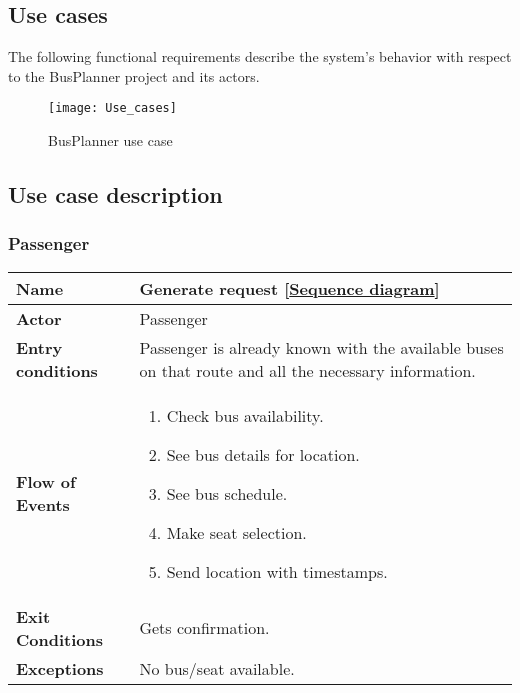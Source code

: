 \subsection{Use cases}
The following functional requirements describe the system’s behavior with respect to the BusPlanner project and its actors.
\begin{figure}[H]
	\centering
	\texttt{[image: Use\_cases]}
	\caption{BusPlanner use case}
\end{figure}
\subsection{Use case description}
\subsubsection{Passenger}
\begin{table}[H]
	\centering
	\begin{tabular}{| m{3.5cm} | m{9.5cm} |}
		\hline
		\textbf{Name} & Generate request [\hyperlink{Generate_request}{Sequence diagram}]\\
		\hline
		\textbf{Actor} & Passenger\\
		\hline
		\textbf{Entry conditions} & Passenger is already known with the available buses on that route and all the necessary information.\\
		\hline
		\textbf{Flow of Events} & 
		\begin{enumerate}
			\item Check bus availability.
			\item See bus details for location.
			\item See bus schedule. 
			\item Make seat selection.
			\item Send location with timestamps.
		\end{enumerate}\\
		\hline
		\textbf{Exit Conditions} & Gets confirmation.\\
		\hline
		\textbf{Exceptions} & No bus/seat available.\\
		\hline
	\end{tabular}
\end{table}
\newpage
